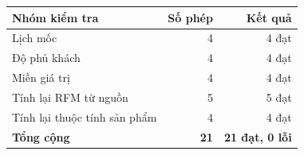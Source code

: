 \begin{tabular}{lrr}
\toprule
Nhóm kiểm tra & Số phép & Kết quả \\
\midrule
Lịch mốc & 4 & 4 đạt \\
Độ phủ khách & 4 & 4 đạt \\
Miền giá trị & 4 & 4 đạt \\
Tính lại RFM từ nguồn & 5 & 5 đạt \\
Tính lại thuộc tính sản phẩm & 4 & 4 đạt \\
\textbf{Tổng cộng} & \textbf{21} & \textbf{21 đạt, 0 lỗi} \\
\bottomrule
\end{tabular}
